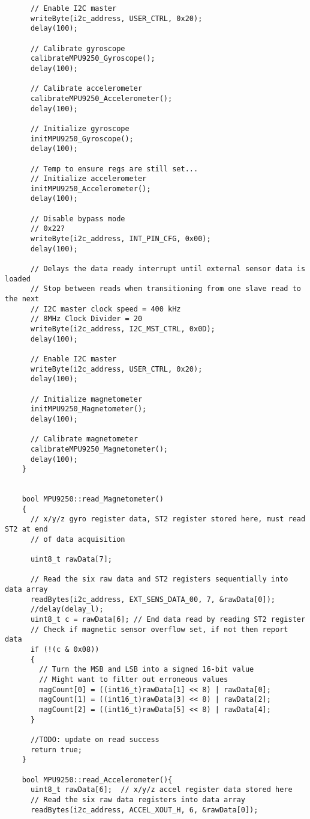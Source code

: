 \begin{lstlisting}
	  // Enable I2C master
	  writeByte(i2c_address, USER_CTRL, 0x20);
	  delay(100);

	  // Calibrate gyroscope
	  calibrateMPU9250_Gyroscope();
	  delay(100);

	  // Calibrate accelerometer
	  calibrateMPU9250_Accelerometer();
	  delay(100);

	  // Initialize gyroscope
	  initMPU9250_Gyroscope();
	  delay(100);

	  // Temp to ensure regs are still set...
	  // Initialize accelerometer
	  initMPU9250_Accelerometer();
	  delay(100);

	  // Disable bypass mode
	  // 0x22?
	  writeByte(i2c_address, INT_PIN_CFG, 0x00);
	  delay(100);

	  // Delays the data ready interrupt until external sensor data is loaded
	  // Stop between reads when transitioning from one slave read to the next
	  // I2C master clock speed = 400 kHz
	  // 8MHz Clock Divider = 20
	  writeByte(i2c_address, I2C_MST_CTRL, 0x0D);
	  delay(100);

	  // Enable I2C master
	  writeByte(i2c_address, USER_CTRL, 0x20);
	  delay(100);

	  // Initialize magnetometer
	  initMPU9250_Magnetometer();
	  delay(100);

	  // Calibrate magnetometer
	  calibrateMPU9250_Magnetometer();
	  delay(100);
	}


	bool MPU9250::read_Magnetometer()
	{
	  // x/y/z gyro register data, ST2 register stored here, must read ST2 at end
	  // of data acquisition

	  uint8_t rawData[7];

	  // Read the six raw data and ST2 registers sequentially into data array
	  readBytes(i2c_address, EXT_SENS_DATA_00, 7, &rawData[0]);
	  //delay(delay_l);
	  uint8_t c = rawData[6]; // End data read by reading ST2 register
	  // Check if magnetic sensor overflow set, if not then report data
	  if (!(c & 0x08))
	  {
	    // Turn the MSB and LSB into a signed 16-bit value
	    // Might want to filter out erroneous values
	    magCount[0] = ((int16_t)rawData[1] << 8) | rawData[0];
	    magCount[1] = ((int16_t)rawData[3] << 8) | rawData[2];
	    magCount[2] = ((int16_t)rawData[5] << 8) | rawData[4];
	  }

	  //TODO: update on read success
	  return true;
	}

	bool MPU9250::read_Accelerometer(){
	  uint8_t rawData[6];  // x/y/z accel register data stored here
	  // Read the six raw data registers into data array
	  readBytes(i2c_address, ACCEL_XOUT_H, 6, &rawData[0]);


\end{lstlisting}
